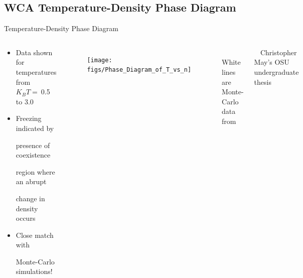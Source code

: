 \documentclass{beamer}
\begin{document}
\subsection{WCA Temperature-Density Phase Diagram}
\begin{frame}{Temperature-Density Phase Diagram}
\begin{columns}
	    \vspace{-3em}
        \begin{block}{}
            \begin{itemize}
              \item Data shown for temperatures from $K_BT=~$0.5 to 3.0
              \item Freezing indicated by 
            
               presence of coexistence
            
               region where an abrupt
               
               change in density occurs
              
              \item Close match with 
              
              Monte-Carlo simulations!
            \end{itemize}
            \end{block}
    \begin{figure}
        \centering
        \texttt{[image: figs/Phase\_Diagram\_of\_T\_vs\_n]}\\
    \end{figure}        
    \vspace{-1em}
    \footnotesize $~~~~~~~~$White lines are Monte-Carlo data from  
    
     $~~~~$Christopher May's OSU undergraduate thesis
     \normalsize
     \end{columns}
\end{frame}
\end{document}
